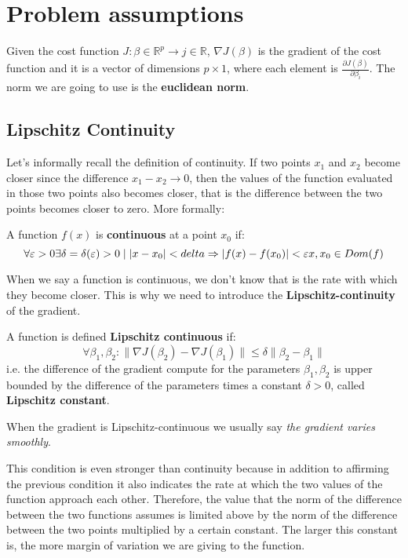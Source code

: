 \section{Problem assumptions}
\begin{remark}
    Given the cost function $J: \beta \in \mathbb{R}^{p} \to  j \in \mathbb{R}$, $\nabla J(\beta)$ is the gradient of the cost function and it is a vector of dimensions $p \times 1$, where each element is $\frac{\partial J(\beta)}{\partial \beta_i}$. The norm we are going to use is the \textbf{euclidean norm}.
\end{remark}

\subsection{Lipschitz Continuity}
Let's informally recall the definition of continuity. If two points $x_1$ and $x_2$ become closer since the difference $x_1 - x_2 \to 0$, then the values of the function evaluated in those two points also becomes closer, that is the difference between the two points becomes closer to zero.
More formally:
\begin{definition}
    A function $f(x)$ is \textbf{continuous} at a point $x_0$ if:
    \[
        \forall \epsilon > 0\exists \delta=\delta(\epsilon) > 0\;|\;|x-x_0| < delta\implies |f(x)-f(x_0)| < \epsilon\\
        x,x_0\in Dom(f)
    \]
\end{definition}

When we say a function is continuous, we don't know that is the rate with which they become closer. This is why we need to introduce the \textbf{Lipschitz-continuity} of the gradient.

\begin{definition}
    A function is defined \textbf{Lipschitz continuous} if:
    \[
        \forall \beta_1, \beta_2 \colon \| \nabla J(\beta_2) - \nabla J(\beta_1)\| \leq \delta \|\beta_2 - \beta_1\|
    \]
    i.e. the difference of the gradient compute for the parameters $\beta_1, \beta_2$ is upper bounded by the difference of the parameters times a constant $\delta > 0$, called \textbf{Lipschitz constant}.
\end{definition}

When the gradient is Lipschitz-continuous we usually say \textit{the gradient varies smoothly}.

This condition is even stronger than continuity because in addition to affirming the previous condition it also indicates the rate at which the two values of the function approach each other.
Therefore, the value that the norm of the difference between the two functions assumes is limited above by the norm of the difference between the two points multiplied by a certain constant.
The larger this constant is, the more margin of variation we are giving to the function.

